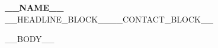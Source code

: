 \documentclass[letterpaper,11pt]{article}
\begin{document}
\begin{center}
    \textbf{\Huge \scshape __NAME__} \\ \vspace{1pt}
__HEADLINE_BLOCK____CONTACT_BLOCK__\end{center}

__BODY__
\end{document}

